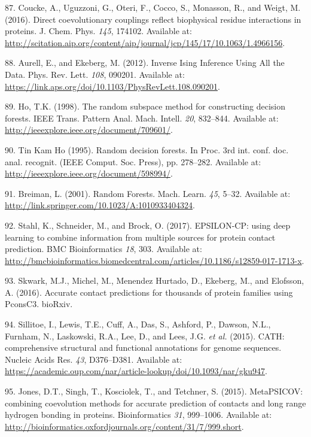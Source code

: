 \documentclass[12pt,a4paper,twoside]{book}
\theoremstyle{definition}
\theoremstyle{definition}
\theoremstyle{remark}
\begin{document}
\hypertarget{ref-Coucke2016}{}
87. Coucke, A., Uguzzoni, G., Oteri, F., Cocco, S., Monasson, R., and
Weigt, M. (2016). Direct coevolutionary couplings reflect biophysical
residue interactions in proteins. J. Chem. Phys. \emph{145}, 174102.
Available at:
\url{http://scitation.aip.org/content/aip/journal/jcp/145/17/10.1063/1.4966156}.

\hypertarget{ref-Aurell2012}{}
88. Aurell, E., and Ekeberg, M. (2012). Inverse Ising Inference Using
All the Data. Phys. Rev. Lett. \emph{108}, 090201. Available at:
\url{https://link.aps.org/doi/10.1103/PhysRevLett.108.090201}.

\hypertarget{ref-Ho1998}{}
89. Ho, T.K. (1998). The random subspace method for constructing
decision forests. IEEE Trans. Pattern Anal. Mach. Intell. \emph{20},
832--844. Available at:
\url{http://ieeexplore.ieee.org/document/709601/}.

\hypertarget{ref-TinKamHo}{}
90. Tin Kam Ho (1995). Random decision forests. In Proc. 3rd int. conf.
doc. anal. recognit. (IEEE Comput. Soc. Press), pp. 278--282. Available
at: \url{http://ieeexplore.ieee.org/document/598994/}.

\hypertarget{ref-Breiman2001}{}
91. Breiman, L. (2001). Random Forests. Mach. Learn. \emph{45}, 5--32.
Available at: \url{http://link.springer.com/10.1023/A:1010933404324}.

\hypertarget{ref-Stahl2017}{}
92. Stahl, K., Schneider, M., and Brock, O. (2017). EPSILON-CP: using
deep learning to combine information from multiple sources for protein
contact prediction. BMC Bioinformatics \emph{18}, 303. Available at:
\url{http://bmcbioinformatics.biomedcentral.com/articles/10.1186/s12859-017-1713-x}.

\hypertarget{ref-Skwark2016}{}
93. Skwark, M.J., Michel, M., Menendez Hurtado, D., Ekeberg, M., and
Elofsson, A. (2016). Accurate contact predictions for thousands of
protein families using PconsC3. bioRxiv.

\hypertarget{ref-Sillitoe2015}{}
94. Sillitoe, I., Lewis, T.E., Cuff, A., Das, S., Ashford, P., Dawson,
N.L., Furnham, N., Laskowski, R.A., Lee, D., and Lees, J.G. \emph{et
al.} (2015). CATH: comprehensive structural and functional annotations
for genome sequences. Nucleic Acids Res. \emph{43}, D376--D381.
Available at:
\url{https://academic.oup.com/nar/article-lookup/doi/10.1093/nar/gku947}.

\hypertarget{ref-Jones2015a}{}
95. Jones, D.T., Singh, T., Kosciolek, T., and Tetchner, S. (2015).
MetaPSICOV: combining coevolution methods for accurate prediction of
contacts and long range hydrogen bonding in proteins. Bioinformatics
\emph{31}, 999--1006. Available at:
\url{http://bioinformatics.oxfordjournals.org/content/31/7/999.short}.
\end{document}

